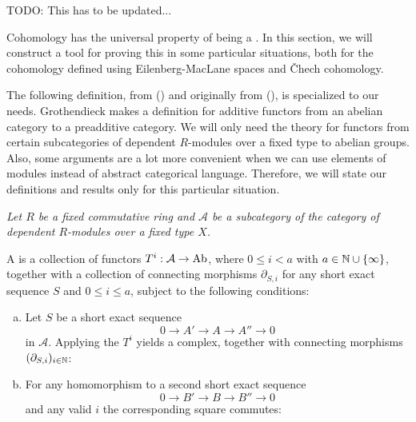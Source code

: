 TODO: This has to be updated...

Cohomology has the universal property of being a .
In this section, we will construct a tool for proving this in some particular situations,
both for the cohomology defined using Eilenberg-MacLane spaces and \v{C}hech cohomology.

The following definition, from (\cite[2.1]{tohoku-translation}) and originally from (\cite{tohoku1957}), is specialized to our needs.
Grothendieck makes a definition for additive functors from an abelian category to a preadditive category.
We will only need the theory for functors from certain subcategories of dependent $R$-modules over a fixed type to abelian groups.
Also, some arguments are a lot more convenient when we can use elements of modules instead of abstract categorical language.
Therefore, we will state our definitions and results only for this particular situation.

\emph{Let $R$ be a fixed commutative ring and $\mathcal A$ be a subcategory of the category of dependent $R$-modules over a fixed type $X$.}

\begin{definition}
  A  is a collection of functors $T^i:\mathcal A\to \operatorname{Ab}$, where $0\leq i < a$ with $a\in\mathbb{N}\cup\{\infty\}$,
  together with a collection of connecting morphisms $\partial_{S,i}$ for any short exact sequence $S$ and $0\leq i\le a$, subject to the following conditions:
  \begin{enumerate}[(a)]
  \item Let $S$ be a short exact sequence
    \[ 0\to A'\to A\to A''\to 0\]
    in $\mathcal A$. Applying the $T^i$ yields a complex, together with connecting morphisms $(\partial_{S,i})_{i\in\mathbb{N}}$:
    \begin{center}
    \end{center}
  \item For any homomorphism to a second short exact sequence
    \[ 0\to B'\to B\to B''\to 0\]
    and any valid $i$ the corresponding square commutes:
    \begin{center}
    \end{center}
  \end{enumerate}
\end{definition}

